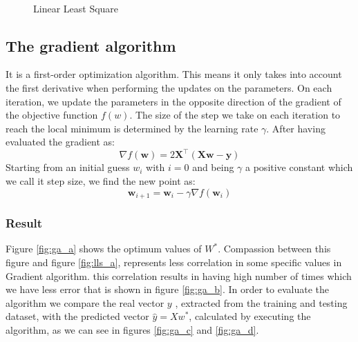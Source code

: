 \documentclass[a4paper,12pt,oneside,titlepage]{article}
\begin{document}
\begin{figure}[H]
\begin{center}
			\\
			\caption{Linear Least Square}
			\label{fig:lls}
		\end{center}
	\end{figure}
	
	
	
	\subsection{The gradient algorithm}
	It is a first-order optimization algorithm. This means it only takes into account the first derivative when performing the updates on the parameters. On each iteration, we update the parameters in the opposite direction of the gradient of the objective function $f(w)$. The size of the step we take on each iteration to reach the local minimum is determined by the learning rate $\gamma$. 
	After having evaluated the gradient as:
	\begin{equation}
	\nabla f ( \mathbf { w } ) = 2 \mathbf { X } ^ { \top } ( \mathbf { X w } - \mathbf { y } )
	\end{equation}
	Starting from an initial guess $w_{i}$  with $i=0$ and being $\gamma$ a positive constant which we call it step size, we find the new point as:
	\begin{equation}
	\mathbf { w } _ { i + 1 } = \mathbf { w } _ { i } - \gamma \nabla f \left( \mathbf { w } _ { i } \right)
	\end{equation}	
	
	\subsubsection{Result}
	Figure \ref{fig:ga_a} shows the optimum values of $W^*$. Compassion between this figure and figure \ref{fig:lls_a}, represents less correlation in some specific values in Gradient algorithm. this correlation results in having high number of times which we have less error that is shown in figure \ref{fig:ga_b}. In order to evaluate the algorithm we compare the real vector $y$ , extracted from the training and testing dataset, with the predicted vector $\hat {y} = Xw^*$, calculated by executing the algorithm, as we can see in figures \ref{fig:ga_c} and \ref{fig:ga_d}.\\
	
\end{document}
